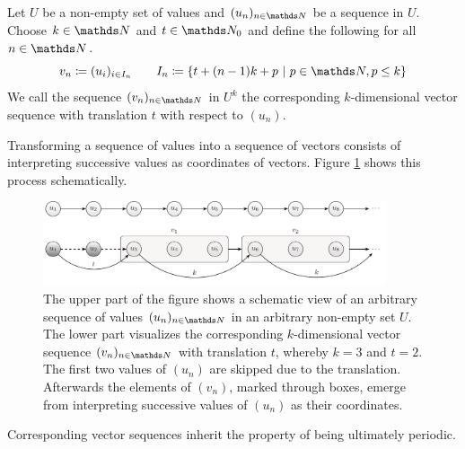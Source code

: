 \documentclass{stdlocal}
\begin{document}
  \begin{definition}
    Let $U$ be a non-empty set of values and $(u_n)_{n\in\setNatural}$ be a sequence in $U$.
    Choose $k\in\setNatural$ and $t\in\setNatural_0$ and define the following for all $n\in\setNatural$.
    \[
      v_n \define (u_i)_{i\in I_n}
      \separate
      I_n \define \set{t + (n-1)k + p}{p\in\setNatural, p \leq k}
    \]
    We call the sequence $(v_n)_{n\in\setNatural}$ in $U^k$ the corresponding $k$-dimensional vector sequence with translation $t$ with respect to $(u_n)$.
  \end{definition}
  Transforming a sequence of values into a sequence of vectors consists of interpreting successive values as coordinates of vectors.
  Figure \ref{fig:vector-sequence-scheme} shows this process schematically.
  \begin{figure}
    \center
    \includegraphics[width=0.9\textwidth]{figures/vector_sequence_scheme.pdf}
    \caption[Corresponding Vector Sequence Scheme]{%
      The upper part of the figure shows a schematic view of an arbitrary sequence of values $(u_n)_{n\in\setNatural}$ in an arbitrary non-empty set $U$.
      The lower part visualizes the corresponding $k$-dimensional vector sequence $(v_n)_{n\in\setNatural}$ with translation $t$, whereby $k=3$ and $t=2$.
      The first two values of $(u_n)$ are skipped due to the translation.
      Afterwards the elements of $(v_n)$, marked through boxes, emerge from interpreting successive values of $(u_n)$ as their coordinates.
    }
    \label{fig:vector-sequence-scheme}
  \end{figure}
  Corresponding vector sequences inherit the property of being ultimately periodic.
\end{document}
